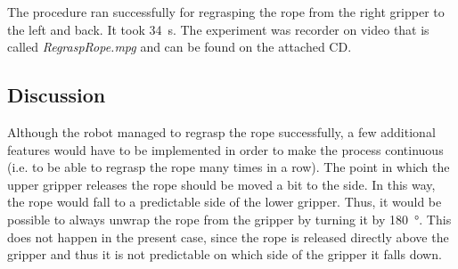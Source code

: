         The procedure ran successfully for regrasping the rope from the right gripper to the left and back. It took \SI{34}{s}. The experiment was recorder on video that is called \textit{RegraspRope.mpg} and can be found on the attached CD.

    \subsection{Discussion}
        Although the robot managed to regrasp the rope successfully, a few additional features would have to be implemented in order to make the process continuous (i.e. to be able to regrasp the rope many times in a row). The point in which the upper gripper releases the rope should be moved a bit to the side. In this way, the rope would fall to a predictable side of the lower gripper. Thus, it would be possible to always unwrap the rope from the gripper by turning it by \SI{180}{\degree}. This does not happen in the present case, since the rope is released directly above the gripper and thus it is not predictable on which side of the gripper it falls down. 